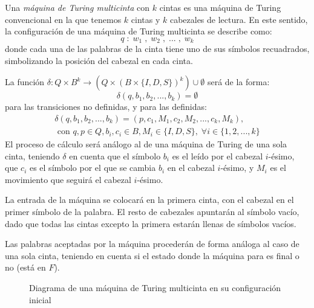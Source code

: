 \begin{definicion}\label{def:maquina-turing-multicinta}
Una \emph{máquina de Turing multicinta} con $k$ cintas es una máquina de Turing convencional en la que tenemos $k$ cintas y $k$ cabezales de lectura. En este sentido, la configuración de una máquina de Turing multicinta se describe como:
$$
    q\;:\;w_1\;,\;w_2\;,\;...\;,\;w_k
$$
donde cada una de las palabras de la cinta tiene uno de sus símbolos recuadrados, simbolizando la posición del cabezal en cada cinta.

La función $\delta : Q \times B^k \longrightarrow \left(Q \times (B \times \{I, D, S\})^k\right) \cup \emptyset$ será de la forma:
$$
\delta(q, b_1, b_2, ..., b_k) = \emptyset
$$
para las transiciones no definidas, y para las definidas:
\begin{multline}
    \delta(q, b_1, b_2, ..., b_k) = (p, c_1, M_1, c_2, M_2, ..., c_k, M_k),\\ \text{ con }q,p\in Q, b_i, c_i \in B, M_i \in \{I, D, S\},\;\forall i \in \{1, 2, ..., k\}
\end{multline}
El proceso de cálculo será análogo al de una máquina de Turing de una sola cinta, teniendo $\delta$ en cuenta que el símbolo $b_i$ es el leído por el cabezal $i$-ésimo, que $c_i$ es el símbolo por el que se cambia $b_i$ en el cabezal $i$-ésimo, y $M_i$ es el movimiento que seguirá el cabezal $i$-ésimo.

La entrada de la máquina se colocará en la primera cinta, con el cabezal en el primer símbolo de la palabra. El resto de cabezales apuntarán al símbolo vacío, dado que todas las cintas excepto la primera estarán llenas de símbolos vacíos.

Las palabras aceptadas por la máquina procederán de forma análoga al caso de una sola cinta, teniendo en cuenta si el estado donde la máquina para es final o no (está en $F$).
\end{definicion}

\begin{figure}[H]
\centering

\caption{Diagrama de una máquina de Turing multicinta en su configuración inicial}
\label{fig:maquina-turing-multicinta}
\end{figure}


